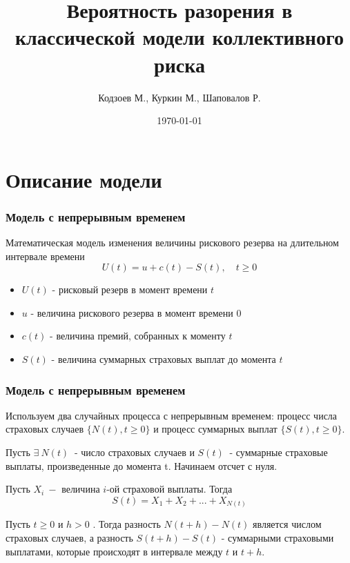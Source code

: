 \documentclass[10pt]{beamer}
\title[Модель коллективного риска]{Вероятность разорения в классической модели коллективного риска}
\author{Кодзоев М., Куркин М., Шаповалов Р.}
\institute[ВМК МГУ]
{
Московский Государственный Университет им. Ломоносова
}
\date{\today}
\begin{document}
\begin{frame}       
\titlepage
\end{frame}


\begin{frame}
\tableofcontents
\end{frame}


\section{Описание модели}
\begin{frame}
\frametitle{Модель с непрерывным временем} 
Математическая модель изменения величины рискового резерва на длительном интервале времени
\begin{equation*}
U(t) = u + c(t) - S(t),\quad t \geq 0
\end{equation*}

\begin{itemize}
    \item $U(t)$ - рисковый резерв в момент времени $t$
    \item $u$ - величина рискового резерва в момент времени 0
    \item $c(t)$ - величина премий, собранных к моменту $t$
    \item $S(t)$ - величина суммарных страховых выплат до момента $t$
\end{itemize}
\end{frame}


\begin{frame}
\frametitle{Модель с непрерывным временем} 

Используем два случайных процесса с непрерывным временем: процесс числа страховых случаев  $\big\{N(t), t\geq 0\big\}$  и процесс суммарных выплат $\big\{S(t), t\geq 0\big\}$.

Пусть $\exists \: N(t)\: $ - число страховых случаев и $S(t)\:  $ - суммарные страховые выплаты, произведенные до момента t. Начинаем отсчет с нуля.

Пусть $ X_{i} \:-$ величина $i$-ой страховой выплаты. Тогда $$S(t) = X_{1}+X_{2}+...+X_{N(t)}$$

Пусть $t\geq 0$ и $h> 0$ . Тогда разность $N(t+h)-N(t)$ является числом страховых случаев, а разность $S(t+h) -S(t)$ - суммарными страховыми выплатами, которые происходят в интервале между $t$ и $t + h$.
\end{frame}
\end{document}
